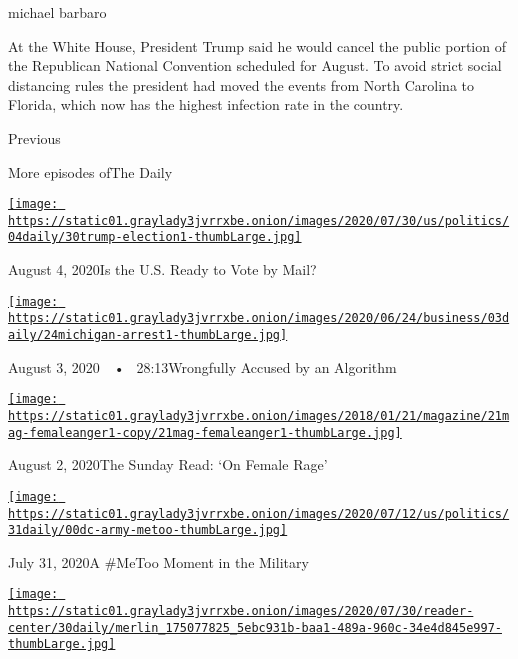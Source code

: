 michael barbaro

At the White House, President Trump said he would cancel the public
portion of the Republican National Convention scheduled for August. To
avoid strict social distancing rules the president had moved the events
from North Carolina to Florida, which now has the highest infection rate
in the country.

Previous

More episodes ofThe Daily

\href{https://www.nytimes3xbfgragh.onion/2020/08/04/podcasts/the-daily/mail-in-voting-president-trump.html?action=click\&module=audio-series-bar\&region=header\&pgtype=Article}{\texttt{[image: https://static01.graylady3jvrrxbe.onion/images/2020/07/30/us/politics/04daily/30trump-election1-thumbLarge.jpg]}}

August 4, 2020Is the U.S. Ready to Vote by Mail?

\href{https://www.nytimes3xbfgragh.onion/2020/08/03/podcasts/the-daily/algorithmic-justice-racism.html?action=click\&module=audio-series-bar\&region=header\&pgtype=Article}{\texttt{[image: https://static01.graylady3jvrrxbe.onion/images/2020/06/24/business/03daily/24michigan-arrest1-thumbLarge.jpg]}}

August 3, 2020~~•~ 28:13Wrongfully Accused by an Algorithm

\href{https://www.nytimes3xbfgragh.onion/2020/08/02/podcasts/the-daily/on-female-rage.html?action=click\&module=audio-series-bar\&region=header\&pgtype=Article}{\texttt{[image: https://static01.graylady3jvrrxbe.onion/images/2018/01/21/magazine/21mag-femaleanger1-copy/21mag-femaleanger1-thumbLarge.jpg]}}

August 2, 2020The Sunday Read: `On Female Rage'

\href{https://www.nytimes3xbfgragh.onion/2020/07/31/podcasts/the-daily/vanessa-guillen-military-metoo.html?action=click\&module=audio-series-bar\&region=header\&pgtype=Article}{\texttt{[image: https://static01.graylady3jvrrxbe.onion/images/2020/07/12/us/politics/31daily/00dc-army-metoo-thumbLarge.jpg]}}

July 31, 2020A \#MeToo Moment in the Military

\href{https://www.nytimes3xbfgragh.onion/2020/07/30/podcasts/the-daily/congress-facebook-amazon-google-apple.html?action=click\&module=audio-series-bar\&region=header\&pgtype=Article}{\texttt{[image: https://static01.graylady3jvrrxbe.onion/images/2020/07/30/reader-center/30daily/merlin\_175077825\_5ebc931b-baa1-489a-960c-34e4d845e997-thumbLarge.jpg]}}

